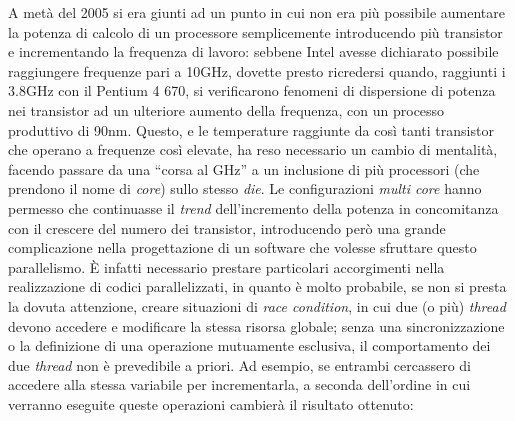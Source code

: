 A metà del 2005 si era giunti ad un punto in cui non era più possibile 
aumentare la potenza di calcolo di un processore semplicemente introducendo
più transistor e incrementando la frequenza di lavoro: sebbene Intel avesse 
dichiarato possibile raggiungere frequenze pari a 10GHz, dovette presto 
ricredersi quando, raggiunti i 3.8GHz con il Pentium 4 670, si verificarono 
fenomeni di dispersione di potenza nei transistor ad un ulteriore aumento della 
frequenza, con un processo produttivo di 90nm.
Questo, e le temperature raggiunte da così tanti transistor che operano a 
frequenze così elevate, ha reso necessario un cambio di mentalità, facendo 
passare da una ``corsa al GHz'' a un inclusione di più processori (che 
prendono il nome di \emph{core}) sullo stesso \emph{die}. 
Le configurazioni \emph{multi core} hanno permesso che continuasse il 
\emph{trend} dell'incremento della potenza in concomitanza con il crescere 
del numero dei transistor, introducendo però una grande complicazione nella 
progettazione di un software che volesse sfruttare questo parallelismo.
È infatti necessario prestare particolari accorgimenti nella realizzazione 
di codici parallelizzati, in quanto è molto probabile, se non si presta la 
dovuta attenzione, creare situazioni di \emph{race condition}, in cui due (o 
più) \emph{thread} devono accedere e modificare la stessa risorsa globale; 
senza una sincronizzazione o la definizione di una operazione mutuamente 
esclusiva, il comportamento dei due \emph{thread} non è prevedibile a priori. 
Ad esempio, se entrambi cercassero di accedere alla stessa variabile per 
incrementarla, a seconda dell'ordine in cui verranno eseguite queste operazioni 
cambierà il risultato ottenuto:
